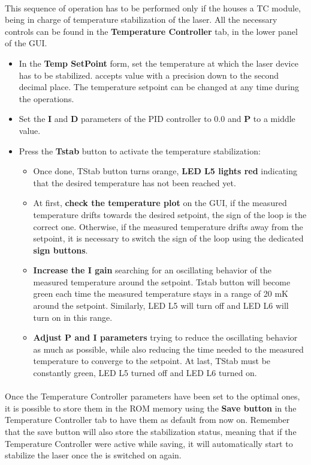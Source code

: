 \paragraph{} This sequence of operation has to be performed only if the \QubeModel  houses a TC module, being in charge of temperature stabilization of the laser. All the necessary controls can be found in the \textbf{Temperature Controller} tab, in the lower panel of the GUI.
\begin{itemize}
    \item In the \textbf{Temp SetPoint} form, set the temperature at which the laser device has to be stabilized. \QubeModel  accepts value with a precision down to the second decimal place. The temperature setpoint can be changed at any time during the operations.
    \item Set the \textbf{I} and \textbf{D} parameters of the PID controller to 0.0 and \textbf{P} to a middle value.
    \item Press the \textbf{Tstab} button to activate the temperature stabilization:
    \begin{itemize}
        \item Once done, TStab button turns orange, \textbf{LED L5 lights red} indicating that the desired temperature has not been reached yet.
        \item At first, \textbf{check the temperature plot} on the GUI, if the measured temperature drifts towards the desired setpoint, the sign of the loop is the correct one. Otherwise, if the measured temperature drifts away from the setpoint, it is necessary to switch the sign of the loop using the dedicated \textbf{sign buttons}.
        \item \textbf{Increase the I gain} searching for an oscillating behavior of the measured temperature around the setpoint. Tstab button will become green each time the measured temperature stays in a range of 20 mK around the setpoint. Similarly, LED L5 will turn off and LED L6 will turn on in this range.
        \item \textbf{Adjust P and I parameters} trying to reduce the oscillating behavior as much as possible, while also reducing the time needed to the measured temperature to converge to the setpoint. At last, TStab must be constantly green, LED L5 turned off and LED L6 turned on.
    \end{itemize}
\end{itemize}

\paragraph{} Once the Temperature Controller parameters have been set to the optimal ones, it is possible to store them in the \QubeModel  ROM memory using the \textbf{Save button} in the Temperature Controller tab to have them as default from now on. Remember that the save button will also store the stabilization status, meaning that if the Temperature Controller were active while saving, it will automatically start to stabilize the laser once the \QubeModel  is switched on again.

